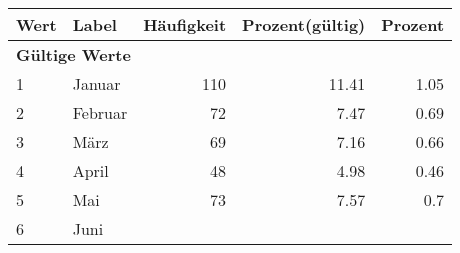      \begin{longtable}{lXrrr}
     \toprule
     \textbf{Wert} & \textbf{Label} & \textbf{Häufigkeit} & \textbf{Prozent(gültig)} & \textbf{Prozent} \\
     \endhead
     \midrule
     \multicolumn{5}{l}{\textbf{Gültige Werte}}\\

     1 &
     \multicolumn{1}{X}{ Januar   } &


       \num{110} &
       \num[round-mode=places,round-precision=2]{11.41} &
         \num[round-mode=places,round-precision=2]{1.05} \\

     2 &
     \multicolumn{1}{X}{ Februar   } &


       \num{72} &
       \num[round-mode=places,round-precision=2]{7.47} &
         \num[round-mode=places,round-precision=2]{0.69} \\

     3 &
     \multicolumn{1}{X}{ März   } &


       \num{69} &
       \num[round-mode=places,round-precision=2]{7.16} &
         \num[round-mode=places,round-precision=2]{0.66} \\

     4 &
     \multicolumn{1}{X}{ April   } &


       \num{48} &
       \num[round-mode=places,round-precision=2]{4.98} &
         \num[round-mode=places,round-precision=2]{0.46} \\

     5 &
     \multicolumn{1}{X}{ Mai   } &


       \num{73} &
       \num[round-mode=places,round-precision=2]{7.57} &
         \num[round-mode=places,round-precision=2]{0.7} \\

     6 &
     \multicolumn{1}{X}{ Juni   } &



\end{longtable}

